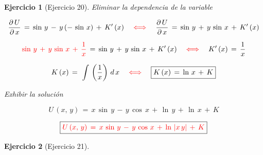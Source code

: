 \documentclass[a4paper,11pt]{book}
\newtheorem{ejer}{Ejercicio}[section]
\begin{document}
\begin{ejer}[Ejercicio 20]
 Eliminar la dependencia de la variable 

  

$$\dfrac{\partial\,U}{\partial\,x}\,=\,\sin\,y\,-\,y\,(-\,\sin\,x)\,+\,K'\,(x) \quad \textcolor{red}{\iff} \quad \dfrac{\partial\,U}{\partial\,x}\,=\,\sin\,y\,+\,y\,\sin\,x\,+\,K'\,(x)$$ 

  

$$\textcolor{red}{\sin\,y\,+\,y\,\sin\,x\,+\,\dfrac{1}{x}}\,=\,\sin\,y\,+\,y\,\sin\,x\,+\,K'\,(x) \quad \textcolor{red}{\iff} \quad K'\,(x)\,=\,\dfrac{1}{x}$$ 

  

$$K\,(x)\,=\,\displaystyle\,\int\,\left(\dfrac{1}{x} \right)\,d\,x \quad \textcolor{red}{\iff} \quad \boxed{K\,(x)\,=\,\ln\,x\,+\,K}$$ 

  

 Exhibir la solución  

  

$$U\,(x,\,y)\,=\,x\,\sin\,y\,-\,y\,\cos\,x\,+\,\ln\,y\,+\,\ln\,x\,+\,K$$ 

  

$$\boxed{\textcolor{red}{U\,(x,\,y)\,=\,x\,\sin\,y\,-\,y\,\cos\,x\,+\,\ln\,|x\,y|\,+\,K } }$$ 

\end{ejer} 

  

\begin{ejer}[Ejercicio 21] 

  

\end{ejer} 

  
\end{document}
